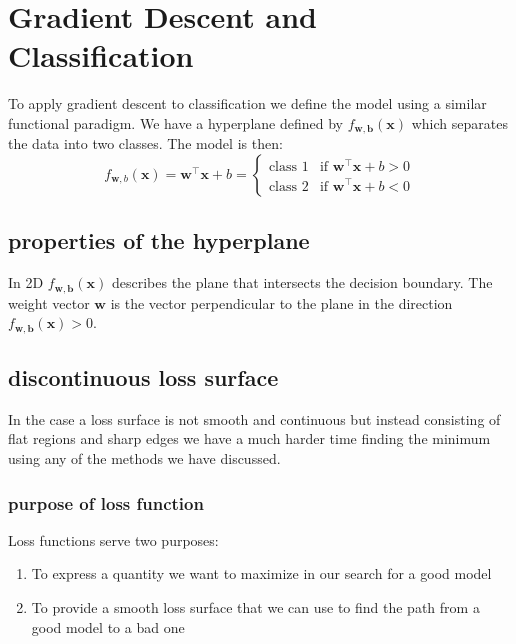 \documentclass[12pt]{article}
\begin{document}
\section{Gradient Descent and Classification}

To apply gradient descent to classification we define the model using a similar functional paradigm. We have a hyperplane defined by $f_{\mathbf{w}, \mathbf{b}}(\mathbf{x})$ which separates the data into two classes. The model is then:
\begin{equation}
    f_{\mathbf{w}, b}(\mathbf{x}) = \mathbf{w}^\intercal \mathbf{x} + b = 
    \begin{cases}
        \text{class 1} & \text{if } \mathbf{w}^\intercal \mathbf{x} + b > 0 \\
        \text{class 2} & \text{if } \mathbf{w}^\intercal \mathbf{x} + b < 0
    \end{cases}
\end{equation}

\subsection{properties of the hyperplane}
In 2D $f_{\mathbf{w}, \mathbf{b}}(\mathbf{x})$ describes the plane that intersects the decision boundary. The weight vector $\mathbf{w}$ is the vector perpendicular to the plane in the direction $f_{\mathbf{w}, \mathbf{b}}(\mathbf{x}) > 0$. 

\subsection{discontinuous loss surface}

In the case a loss surface is not smooth and continuous but instead consisting of flat regions and sharp edges we have a much harder time finding the minimum using any of the methods we have discussed.

\subsubsection*{purpose of loss function}

Loss functions serve two purposes:
\begin{enumerate}[leftmargin=*, noitemsep]
    \item To express a quantity we want to maximize in our search for a good model 
    \item To provide a smooth loss surface that we can use to find the path from a good model to a bad one
\end{enumerate}
\end{document}
